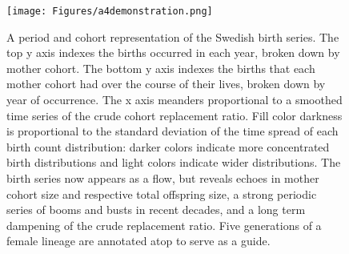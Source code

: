 \begin{figure}
\texttt{[image: Figures/a4demonstration.png]}
\caption{A period and cohort representation of the Swedish birth series. The top y axis indexes the births occurred in each year, broken down by mother cohort. The bottom y axis indexes the births that each mother cohort had over the course of their lives, broken down by year of occurrence. The x axis meanders proportional to a smoothed time series of the crude cohort replacement ratio. Fill color darkness is proportional to the standard deviation of the time spread of each birth count distribution: darker colors indicate more concentrated birth distributions and light colors indicate wider distributions. The birth series now appears as a flow, but reveals echoes in mother cohort size and respective total offspring size, a strong periodic series of booms and busts in recent decades, and a long term dampening of the crude replacement ratio. Five generations of a female lineage are annotated atop to serve as a guide.
}
\label{fig:foldout}
\end{figure}